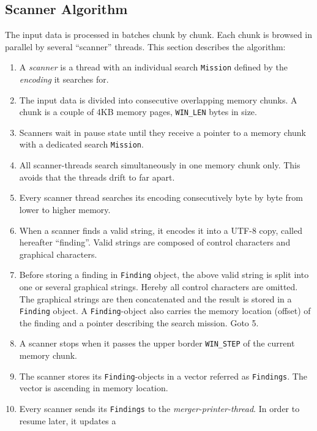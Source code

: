 \hypertarget{_scanner_algorithm}{\subsection{Scanner
Algorithm}\label{_scanner_algorithm}}

The input data is processed in batches chunk by chunk. Each chunk is
browsed in parallel by several ``scanner'' threads. This section
describes the algorithm:

\begin{enumerate}
\def\labelenumi{\arabic{enumi}.}
\item
  A \emph{scanner} is a thread with an individual search
  \texttt{Mission} defined by the \emph{encoding} it searches for.
\item
  The input data is divided into consecutive overlapping memory chunks.
  A chunk is a couple of 4KB memory pages, \texttt{WIN\_LEN} bytes in
  size.
\item
  Scanners wait in pause state until they receive a pointer to a memory
  chunk with a dedicated search \texttt{Mission}.
\item
  All scanner-threads search simultaneously in one memory chunk only.
  This avoids that the threads drift to far apart.
\item
  Every scanner thread searches its encoding consecutively byte by byte
  from lower to higher memory.
\item
  When a scanner finds a valid string, it encodes it into a UTF-8 copy,
  called hereafter ``finding''. Valid strings are composed of control
  characters and graphical characters.
\item
  Before storing a finding in \texttt{Finding} object, the above valid
  string is split into one or several graphical strings. Hereby all
  control characters are omitted. The graphical strings are then
  concatenated and the result is stored in a \texttt{Finding} object. A
  \texttt{Finding}-object also carries the memory location (offset) of
  the finding and a pointer describing the search mission. Goto 5.
\item
  A scanner stops when it passes the upper border \texttt{WIN\_STEP} of
  the current memory chunk.
\item
  The scanner stores its \texttt{Finding}-objects in a vector referred
  as \texttt{Findings}. The vector is ascending in memory location.
\item
  Every scanner sends its \texttt{Findings} to the
  \emph{merger-printer-thread}. In order to resume later, it updates a

\end{enumerate}

